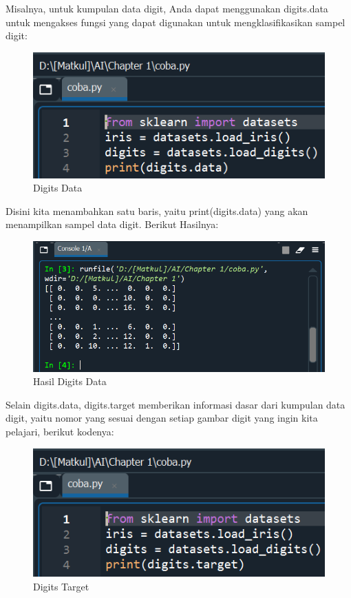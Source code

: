 \par Misalnya, untuk kumpulan data digit, Anda dapat menggunakan digits.data untuk mengakses fungsi yang dapat digunakan untuk mengklasifikasikan sampel digit:
    \begin{figure}[H]
    \centering
    \includegraphics[width=12cm]{figures/1184023/4.PNG}
    \caption{Digits Data}
    \end{figure}

\par Disini kita menambahkan satu baris, yaitu print(digits.data) yang akan menampilkan sampel data digit. Berikut Hasilnya:
    \begin{figure}[H]
    \centering
    \includegraphics[width=13cm]{figures/1184023/5.PNG}
    \caption{Hasil Digits Data}
    \end{figure}
    
\par Selain digits.data, digits.target memberikan informasi dasar dari kumpulan data digit, yaitu nomor yang sesuai dengan setiap gambar digit yang ingin kita pelajari, berikut kodenya:
    \begin{figure}[H]
    \centering
    \includegraphics[width=13cm]{figures/1184023/6.PNG}
    \caption{Digits Target}
    \end{figure}

